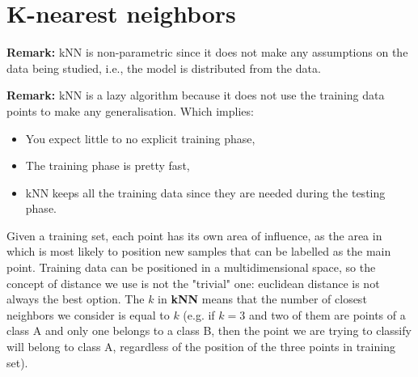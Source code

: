 \chapter{K-nearest neighbors}
\label{cha:KNN}


\textbf{Remark:} kNN is non-parametric since it does not make any assumptions on the data being studied, i.e., the model is distributed from the data. \newline

\textbf{Remark:} kNN is a lazy algorithm because it does not use the training data points to make any generalisation. Which implies: \begin{itemize}
    \item You expect little to no explicit training phase,
    \item The training phase is pretty fast,
    \item kNN keeps all the training data since they are needed during the testing phase.
\end{itemize}

Given a training set, each point has its own area of influence, as the area in which is most likely to position new samples that can be labelled as the main point.
Training data can be positioned in a multidimensional space, so the concept of distance we use is not the "trivial" one: euclidean distance is not always the best option. 
The $k$ in \textbf{kNN} means that the number of closest neighbors we consider is equal to $k$ (e.g. if $k=3$ and two of them are points of a class A and only one belongs to a class B, then the point we are trying to classify will belong to class A, regardless of the position of the three points in training set).\\


